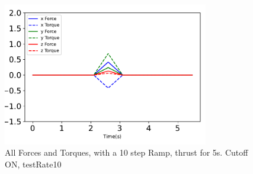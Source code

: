 \begin{figure}[htbp]\centerline{\includegraphics[width=0.8\textwidth]{AutoTeX/Ramp_10steps_CutoffON_5s_testRate10}}\caption{All Forces and Torques, with a 10 step Ramp, thrust for 5s. Cutoff ON, testRate10}\label{fig:Ramp_10steps_CutoffON_5s_testRate10}\end{figure}